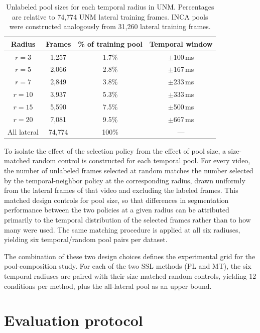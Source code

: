 \documentclass[
  msc,
  american
]{ThesisPUC_v2}
\begin{document}
\begin{table}[!t]
\centering
\footnotesize
\caption[Unlabeled pool sizes per temporal radius in UNM.]{Unlabeled pool sizes for each temporal radius in UNM. Percentages are relative to 74{,}774 UNM lateral training frames. INCA pools were constructed analogously from 31{,}260 lateral training frames.}
\label{tab:pools}
\begin{tabular}{@{}cccc@{}}
\toprule
\textbf{Radius} & \textbf{Frames} & \textbf{\% of training pool} & \textbf{Temporal window} \\
\midrule
$r=3$     & 1{,}257  & 1.7\%   & $\pm$100\,ms \\
$r=5$     & 2{,}066  & 2.8\%   & $\pm$167\,ms \\
$r=7$     & 2{,}849  & 3.8\%   & $\pm$233\,ms \\
$r=10$    & 3{,}937  & 5.3\%   & $\pm$333\,ms \\
$r=15$    & 5{,}590  & 7.5\%   & $\pm$500\,ms \\
$r=20$    & 7{,}081  & 9.5\%   & $\pm$667\,ms \\
All lateral & 74{,}774 & 100\%   & --- \\
\bottomrule
\end{tabular}
\end{table}

To isolate the effect of the selection policy from the effect of pool size, a size-matched random control is constructed for each temporal pool. For every video, the number of unlabeled frames selected at random matches the number selected by the temporal-neighbor policy at the corresponding radius, drawn uniformly from the lateral frames of that video and excluding the labeled frames. This matched design controls for pool size, so that differences in segmentation performance between the two policies at a given radius can be attributed primarily to the temporal distribution of the selected frames rather than to how many were used. The same matching procedure is applied at all six radiuses, yielding six temporal/random pool pairs per dataset.

The combination of these two design choices defines the experimental grid for the pool-composition study. For each of the two SSL methods (PL and MT), the six temporal radiuses are paired with their size-matched random controls, yielding 12 conditions per method, plus the all-lateral pool as an upper bound.

\section{Evaluation protocol}
\label{sec:method-eval}
\end{document}
